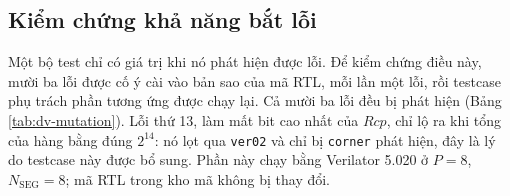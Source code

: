 
\subsection{Kiểm chứng khả năng bắt lỗi}

Một bộ test chỉ có giá trị khi nó phát hiện được lỗi. Để kiểm chứng điều này, mười ba lỗi được cố ý cài vào bản sao của mã RTL, mỗi lần một lỗi, rồi testcase phụ trách phần tương ứng được chạy lại. Cả mười ba lỗi đều bị phát hiện (Bảng \ref{tab:dv-mutation}). Lỗi thứ 13, làm mất bit cao nhất của $\mathit{Rcp}$, chỉ lộ ra khi tổng của hàng bằng đúng $2^{14}$: nó lọt qua \texttt{ver02} và chỉ bị \texttt{corner} phát hiện, đây là lý do testcase này được bổ sung. Phần này chạy bằng Verilator 5.020 ở $P = 8$, $N_{\text{SEG}} = 8$; mã RTL trong kho mã không bị thay đổi.

